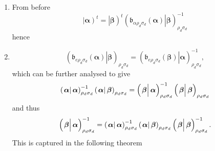 \documentclass[aps,preprint]{revtex4}
\begin{document}
\begin{enumerate}
\begin{enumerate}
\item From before 
\begin{equation*}
\left\vert \overset{}{\boldsymbol{\alpha }}\right) ^{t}=\left\vert \overset{}%
{\boldsymbol{\beta }}\right) ^{t}\left( \left. \overset{}{\mathfrak{b}%
_{\alpha \rho _{d}\sigma _{d}}}\left( \boldsymbol{\alpha }\right)
\right\vert \boldsymbol{\beta }\right) _{\rho _{d}\sigma _{d}}^{-1}
\end{equation*}%
hence

\item 
\begin{equation}
\left( \left. \overset{}{\mathfrak{b}_{e\rho _{d}\sigma _{d}}\left( 
\boldsymbol{\alpha }\right) }\right\vert \boldsymbol{\beta }\right) _{\rho
_{d}\sigma _{d}}=\left( \left. \overset{}{\mathfrak{b}_{e\rho _{d}\sigma
_{d}}\left( \boldsymbol{\beta }\right) }\right\vert \boldsymbol{\alpha }%
\right) _{\rho _{d}\sigma _{d}}^{-1},
\end{equation}%
which can be further analysed to give 
\begin{equation}
\left( \left. \overset{}{\boldsymbol{\alpha }}\right\vert \boldsymbol{\alpha 
}\right) _{\rho _{d}\sigma _{d}}^{-1}\left( \left. \overset{}{\boldsymbol{%
\alpha }}\right\vert \boldsymbol{\beta }\right) _{\rho _{d}\sigma
_{d}}=\left( \left. \overset{}{\boldsymbol{\beta }}\right\vert \boldsymbol{%
\alpha }\right) _{\rho _{d}\sigma _{d}}^{-1}\left( \left. \overset{}{%
\boldsymbol{\beta }}\right\vert \boldsymbol{\beta }\right) _{\rho _{d}\sigma
_{d}}
\end{equation}%
and thus 
\begin{equation}
\left( \left. \overset{}{\boldsymbol{\beta }}\right\vert \boldsymbol{\alpha }%
\right) _{\rho _{d}\sigma _{d}}^{-1}=\left( \left. \overset{}{\boldsymbol{%
\alpha }}\right\vert \boldsymbol{\alpha }\right) _{\rho _{d}\sigma
_{d}}^{-1}\left( \left. \overset{}{\boldsymbol{\alpha }}\right\vert 
\boldsymbol{\beta }\right) _{\rho _{d}\sigma _{d}}\left( \left. \overset{}{%
\boldsymbol{\beta }}\right\vert \boldsymbol{\beta }\right) _{\rho _{d}\sigma
_{d}}^{-1}.
\end{equation}%
This is captured in the following theorem
\end{enumerate}
\end{enumerate}
\end{document}
